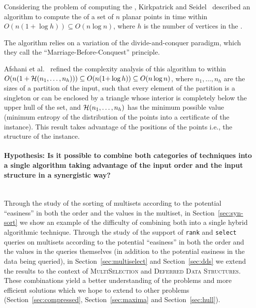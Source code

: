 Considering the problem of computing the {}, Kirkpatrick and Seidel~\cite{1986-JCom-TheUltimatePlanarConvexHullAlgorithm-KirkpatrickSeidel} described an algorithm to compute the {} of a set of $n$ planar points in time within $O(n(1+\log h))\subseteq O(n\log n)$, where $h$ is the number of vertices in the {}.
\begin{INUTILE}
  The algorithm relies on a variation of the divide-and-conquer
  paradigm, which they call the ``Marriage-Before-Conquest''
  principle.
\end{INUTILE}
Afshani et al.~\cite{2009-FOCS-InstanceOptimalGeometricAlgorithms-AfshaniBarbayChan} refined the complexity analysis of this algorithm to within $O(n(1+{\cal H}(n_1,\ldots,n_h)))\subseteq O(n(1{+}\log h)) \subseteq O(n\log{n})$, where $n_1, \dots, n_h$ are the sizes of a partition of the input, such that every element of the partition is a singleton or can be enclosed by a triangle whose interior is completely below the upper hull of the set, and ${\cal H}(n_1,\ldots,n_h)$ has the minimum possible value (minimum entropy of the distribution of the points into a certificate of the instance). This result takes advantage of the positions of the points i.e., the structure of the instance.


\paragraph{Hypothesis: Is it possible to combine both categories of
techniques into a single algorithm taking advantage of the input order
and the input structure in a synergistic way?}~\\


Through the study of the sorting of multisets according to the
potential ``easiness'' in both the order and the values in the
multiset, in Section~\ref{sec:syn-sort} we show an
example of the difficulty of combining both into a single hybrid
algorithmic technique.
%
Through the study of the support of \texttt{rank} and
\texttt{select} queries on multisets according to the potential
``easiness'' in both the order and the values in the queries
themselves (in addition to the potential easiness in the data being
queried), in Section~\ref{sec:multiselect} and Section~\ref{sec:dds}
we extend the results to the context of \textsc{MultiSelection} and
\textsc{Deferred Data Structures}. These combinations yield a better
understanding of the problems and more efficient solutions which we
hope to extend to other problems (Section~\ref{sec:compressed},
Section~\ref{sec:maxima} and Section~\ref{sec:hull}).

